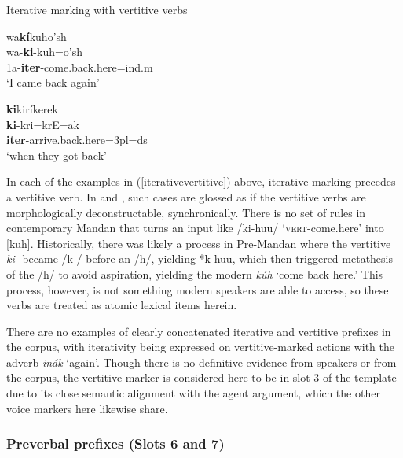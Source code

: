 \begin{exe}
\item\label{iterativevertitive} Iterative marking with vertitive verbs

\begin{xlist}

\item \glll wa\textbf{kí}kuho'sh\\
	wa-\textbf{ki}-kuh=o'sh\\
	1a-\textbf{iter}-\textnormal{come.back.here}=ind.m\\
	\glt `I came back again' \citep[12]{mixco1997a}
	
	\item \glll \textbf{ki}kiríkerek\\
	\textbf{ki}-kri=krE=ak\\
	\textbf{iter}-\textnormal{arrive.back.here}=3pl=ds\\
	\glt `when they got back' \citep[39]{kennard1936}
	
	\end{xlist}
	
\end{exe}

In each of the examples in (\ref{iterativevertitive}) above, iterative marking precedes a vertitive verb. In \citet{hollow1970} and \citet{mixco1997a}, such cases are glossed as if the vertitive verbs are morphologically deconstructable, synchronically. There is no set of rules in contemporary Mandan that turns an input like /ki-huu/ `\textsc{vert}-come.here' into [kuh]. Historically, there was likely a process in Pre-Mandan where the vertitive \textit{ki-} became /k-/ before an /h/, yielding *k-huu, which then triggered metathesis of the /h/ to avoid aspiration, yielding the modern \textit{kúh} `come back here.' This process, however, is not something modern speakers are able to access, so these verbs are treated as atomic lexical items herein. 

There are no examples of clearly concatenated iterative and vertitive prefixes in the corpus, with iterativity being expressed on vertitive-marked actions with the adverb \textit{inák} `again'. Though there is no definitive evidence from speakers or from the corpus, the vertitive marker is considered here to be in slot 3 of the template due to its close semantic alignment with the agent argument, which the other voice markers here likewise share.

\subsubsection{Preverbal prefixes (Slots 6 and 7)}\label{SubsubsecPreverbs}

